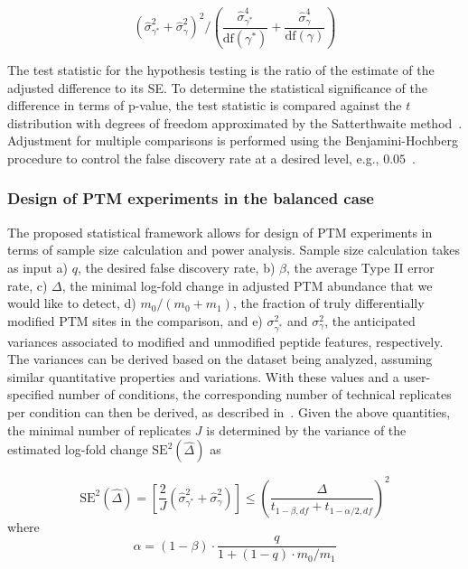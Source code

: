\documentclass[mcp]{article}
\numberwithin{table}{section}
\begin{document}
\begin{equation}
\left( \hat{\sigma}_{\gamma^{\ast}}^{2} + \hat{\sigma}_{\gamma}^{2} \right)^2 \bigg/
\left( \frac{\hat{\sigma}_{\gamma^{\ast}}^{4}}{\mathrm{df}(\gamma^{\ast})} + \frac{\hat{\sigma}_{\gamma}^{4}}{ \mathrm{df}(\gamma)} \right)
\label{eq:prop_df}
\end{equation}

The test statistic for the hypothesis testing is the ratio of the estimate of the adjusted difference to its SE. To determine the statistical significance of the difference in terms of p-value, the test statistic is compared against the $t$ distribution with degrees of freedom approximated by the Satterthwaite method~\cite{satterthwaite:1946}. Adjustment for multiple comparisons is performed using the Benjamini-Hochberg procedure to control the false discovery rate at a desired level, e.g., $0.05$~\cite{Benjamini:1995}.

\subsubsection*{Design of PTM experiments in the balanced case}
\label{sec:design}

The proposed statistical framework allows for design of PTM experiments in terms of sample size calculation and power analysis. 
Sample size calculation takes as input a) $q$, the desired false discovery rate, b) $\beta$, the average Type II error rate, c) $\Delta$, the minimal log-fold change in adjusted PTM abundance that we would like to detect, d) $m_0 / (m_0 + m_1)$, the fraction of truly differentially modified PTM sites in the comparison, and e) $\sigma_{\gamma^{\ast}}^{2}$ and $\sigma_{\gamma}^{2}$, the anticipated variances associated to modified and unmodified peptide features, respectively. The variances can be derived based on the dataset being analyzed, assuming similar quantitative properties and variations. With these values and a user-specified number of conditions, the corresponding number of technical replicates per condition can then be derived, as described in~\cite{kutner_etal_04a}. Given the above quantities, the minimal number of replicates $J$ is determined by the variance of the estimated log-fold change $\mathrm{SE}^{2}(\hat{\Delta})$ as

\begin{equation}
\mathrm{SE}^{2}(\hat{\Delta}) = \left[ \frac{2}{J} \left( \hat{\sigma}_{\gamma^{\ast}}^{2} + \hat{\sigma}_{\gamma}^{2} \right) \right]
\leq \left( \frac{\Delta}{t_{1-\beta, df} + t_{1-\alpha /2, df}} \right)^{2}
\end{equation}
where 
\begin{equation}
\alpha = (1 - \beta) \cdot \frac{q}{1 + (1-q) \cdot m_0 / m_1}
\end{equation}
\end{document}
